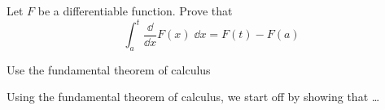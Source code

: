 \documentclass[../main.tex]{subfile}
\begin{document}
\begin{exercise}{1}
Let $F$ be a differentiable function. Prove that 
\[
\int_a^t \frac{\dd}{\dd x} F(x)\;\dd x = F(t) - F(a)
\] 
\end{exercise}
\begin{hints}
  \item Use the fundamental theorem of calculus 
\end{hints}
\begin{solution}
  Using the fundamental theorem of calculus, we start off by showing that \ldots 
\end{solution}
\end{document}
